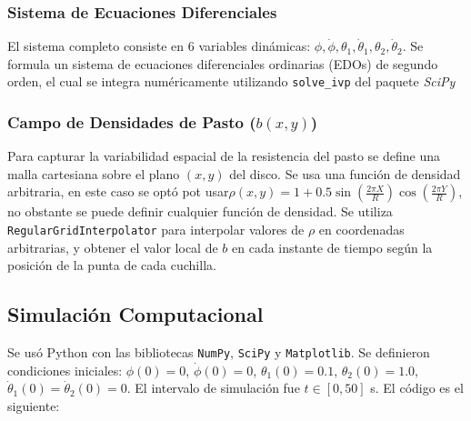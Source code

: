 \documentclass[12pt]{article}
\begin{document}
\subsubsection{Sistema de Ecuaciones Diferenciales}
El sistema completo consiste en 6 variables dinámicas: $\phi, \dot{\phi}, \theta_1, \dot{\theta}_1, \theta_2, \dot{\theta}_2$. Se formula un sistema de ecuaciones diferenciales ordinarias (EDOs) de segundo orden, el cual se integra numéricamente utilizando \texttt{solve\_ivp} del paquete \textit{SciPy}

\subsubsection{Campo de Densidades de Pasto ($b(x,y)$)}
Para capturar la variabilidad espacial de la resistencia del pasto se define una malla cartesiana sobre el plano $(x, y)$ del disco. Se usa una función de densidad arbitraria, en este caso se optó pot usar$\rho(x, y) = 1 + 0.5 \sin\left(\frac{2\pi X}{R}\right) \cos\left(\frac{2\pi Y}{R}\right)$, no obstante se puede definir cualquier función de densidad. Se utiliza \texttt{RegularGridInterpolator} para interpolar valores de $\rho$ en coordenadas arbitrarias, y obtener el valor local de $b$ en cada instante de tiempo según la posición de la punta de cada cuchilla.

\subsection{ Simulación Computacional}
Se usó Python con las bibliotecas \texttt{NumPy}, \texttt{SciPy} y \texttt{Matplotlib}. Se definieron condiciones iniciales: $\phi(0) = 0$, $\dot{\phi}(0) = 0$, $\theta_1(0) = 0.1$, $\theta_2(0) = 1.0$, $\dot{\theta}_1(0) = \dot{\theta}_2(0) = 0$. El intervalo de simulación fue $t \in [0, 50]$ s. El código es el siguiente:
\end{document}
